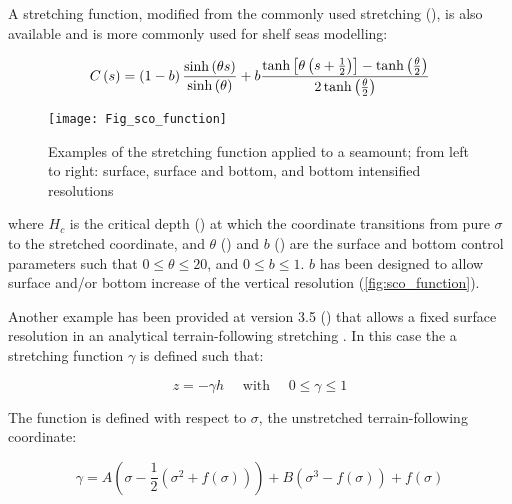 \documentclass[../tex_main/NEMO_manual]{subfiles}
\begin{document}
A stretching function, modified from the commonly used \citet{Song_Haidvogel_JCP94} 
stretching (), is also available and is more commonly used for shelf seas modelling:

\begin{equation}
  C\left(s\right) =   \left(1 - b \right)\frac{ \sinh\left( \theta s\right)}{\sinh\left(\theta\right)} +      \\
  b\frac{ \tanh \left[ \theta \left(s + \frac{1}{2} \right)\right] - \tanh\left(\frac{\theta}{2}\right)}{ 2\tanh\left (\frac{\theta}{2}\right)}
  \label{eq:SH94_2}
\end{equation}

\begin{figure}[!ht]    \begin{center}
\texttt{[image: Fig\_sco\_function]}
\caption{  \protect\label{fig:sco_function}   
Examples of the stretching function applied to a seamount; from left to right: 
surface, surface and bottom, and bottom intensified resolutions}
\end{center}   \end{figure}

where $H_c$ is the critical depth () at which the coordinate transitions from 
pure $\sigma$ to the stretched coordinate,  and $\theta$ () and $b$ () 
are the surface and bottom control parameters such that $0\leqslant \theta \leqslant 20$, and 
$0\leqslant b\leqslant 1$. $b$ has been designed to allow surface and/or bottom 
increase of the vertical resolution (\autoref{fig:sco_function}).

Another example has been provided at version 3.5 () that allows 
a fixed surface resolution in an analytical terrain-following stretching \citet{Siddorn_Furner_OM12}. 
In this case the a stretching function $\gamma$ is defined such that:

\begin{equation}
z = -\gamma h \quad \text{ with } \quad 0 \leq \gamma \leq 1
\label{eq:z}
\end{equation}

The function is defined with respect to $\sigma$, the unstretched terrain-following coordinate:

\begin{equation} \label{eq:DOM_gamma_deriv}
\gamma= A\left(\sigma-\frac{1}{2}\left(\sigma^{2}+f\left(\sigma\right)\right)\right)+B\left(\sigma^{3}-f\left(\sigma\right)\right)+f\left(\sigma\right)
\end{equation}
\end{document}
